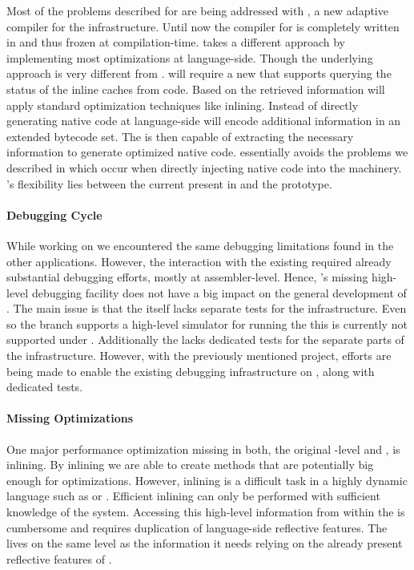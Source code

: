 Most of the problems described for \NBJ are being addressed with \Sista, a new adaptive \JIT compiler for the \Cog infrastructure. 
Until now the \JIT compiler for \Cog is completely written in \Slang and thus frozen at \VM compilation-time.
\Sista takes a different approach by implementing most \JIT optimizations at language-side.
Though the underlying approach is very different from \NBJ.
\Sista will require a new \VM that supports querying the status of the inline caches from \PH code.
Based on the retrieved information \Sista will apply standard optimization techniques like inlining.
Instead of directly generating native code at language-side \Sista will encode additional information in an extended bytecode set.
The \VM is then capable of extracting the necessary information to generate optimized native code.
\Sista essentially avoids the problems we described in  which occur when directly injecting native code into the \JIT machinery.
\Sista's flexibility lies between the current \JIT present in \Cog and the \NBJ prototype.

\paragraph{Debugging Cycle}
While working on \NBJ we encountered the same debugging limitations found in the other \B applications.
However, the interaction with the existing \JIT required already substantial debugging efforts, mostly at assembler-level.
Hence, \B's missing high-level debugging facility does not have a big impact on the general development of \NBJ.
The main issue is that the \VM itself lacks separate tests for the \JIT infrastructure.
Even so the \Cog branch supports a high-level simulator for running the \JIT this is currently not supported under \PH.
Additionally the \VM lacks dedicated tests for the separate parts of the \JIT infrastructure.
However, with the previously mentioned \Sista project, efforts are being made to enable the existing \VM debugging infrastructure on \PH, along with dedicated tests.

\paragraph{Missing Optimizations}
One major performance optimization missing in both, the original \PH \VM-level \JIT and \NBJ, is inlining. 
By inlining we are able to create methods that are potentially big enough for optimizations.
However, inlining is a difficult task in a highly dynamic language such as \ST or \Self \cite{Cham89a}. 
Efficient inlining can only be performed with sufficient knowledge of the system. 
Accessing this high-level information from within the \VM is cumbersome and requires duplication of language-side reflective features.
The \JIT lives on the same level as the information it needs relying on the already present reflective features of \ST.


